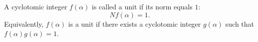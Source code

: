 A cyclotomic integer $f(\alpha)$ is called a unit if its norm equals $1$:
$$Nf(\alpha) = 1.$$
Equivalently, $f(\alpha)$ is a unit if there exists a cyclotomic integer $g(\alpha)$ such that $f(\alpha)g(\alpha) = 1$.
